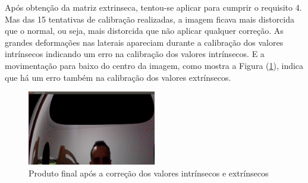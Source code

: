 Após obtenção da matriz extrinseca, tentou-se aplicar para cumprir o requisito 4. Mas das 15 tentativas de calibração realizadas, a imagem ficava mais distorcida que o normal, ou seja, mais distorcida que não aplicar qualquer correção. As grandes deformações nas laterais apareciam durante a calibração dos valores intrínsecos indicando um erro na calibração dos valores intrínsecos. E a movimentação para baixo do centro da imagem, como mostra a Figura (\ref{fig:distorcao}), indica que há um erro também na calibração dos valores extrínsecos.

\begin{figure}[!ht]
\centering
\label{fig:distorcao}
\includegraphics[width=0.5\textwidth]{img/distorcao.png}
\caption{Produto final após a correção dos valores intrínsecos e extrínsecos}
\end{figure}